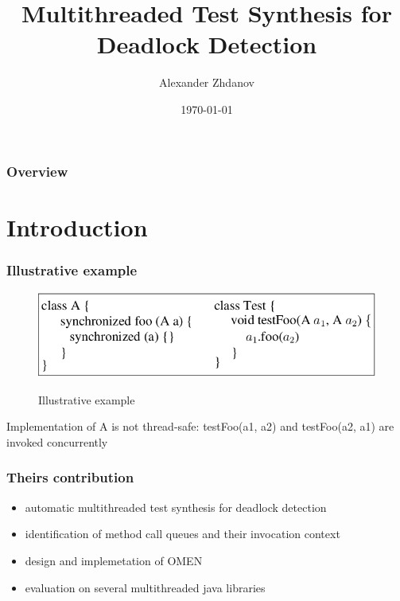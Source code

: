 \documentclass{beamer}
\title[multithreaded test synthesis]{Multithreaded Test Synthesis for Deadlock Detection} %
\author{Alexander Zhdanov} %
\institute[TUD.SOLA] %
{Technical University Darmstadt\\ Software Lab \\ %
\medskip
\textit{azhdanov@hotmail.com} %
}
\date{\today} %
\begin{document}
\begin{frame}
\titlepage %
\end{frame}

\begin{frame}
\frametitle{Overview} %
\tableofcontents %
\end{frame}


\section{Introduction} %

\begin{frame}
\frametitle{Illustrative example}
\begin{figure}
\includegraphics[scale = 0.5]{Images/Illustrative_example}\\
\caption{Illustrative example}
\end{figure}
Implementation of A is not thread-safe: testFoo(a1, a2) and testFoo(a2, a1) are invoked concurrently
\end{frame}

\begin{frame}
\frametitle{Theirs contribution}

    \begin{itemize}
    \item automatic multithreaded test synthesis for deadlock detection
    \item identification of method call queues and their invocation context
    \item design and implemetation of OMEN
    \item evaluation on several multithreaded java libraries
    \end{itemize}

\end{frame}
\end{document}
